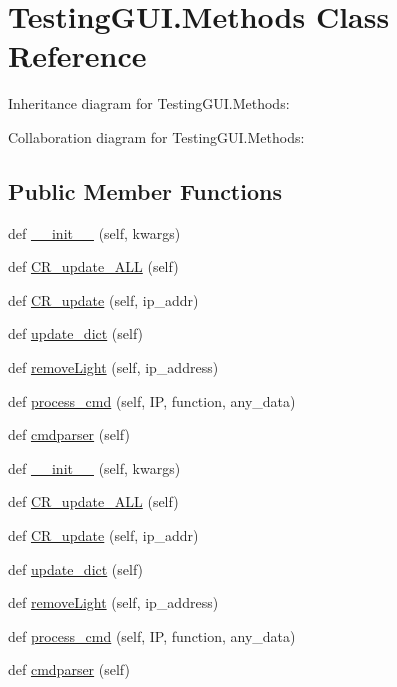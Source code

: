 \hypertarget{classTestingGUI_1_1Methods}{}\section{Testing\+G\+U\+I.\+Methods Class Reference}
\label{classTestingGUI_1_1Methods}


Inheritance diagram for Testing\+G\+U\+I.\+Methods\+:


Collaboration diagram for Testing\+G\+U\+I.\+Methods\+:
\subsection*{Public Member Functions}
\begin{DoxyCompactItemize}
\item 
def \hyperlink{classTestingGUI_1_1Methods_a6b7453ea737e1e8b53e33f999d0c9f2a}{\+\_\+\+\_\+init\+\_\+\+\_\+} (self, kwargs)
\item 
def \hyperlink{classTestingGUI_1_1Methods_a7caae1065692f63bf28b64e8f7c0709b}{C\+R\+\_\+update\+\_\+\+A\+LL} (self)
\item 
def \hyperlink{classTestingGUI_1_1Methods_a9c1aa20eca768d36ff23c118e35052eb}{C\+R\+\_\+update} (self, ip\+\_\+addr)
\item 
def \hyperlink{classTestingGUI_1_1Methods_a0709231f5f6f33c59ce325c7e3ebf156}{update\+\_\+dict} (self)
\item 
def \hyperlink{classTestingGUI_1_1Methods_adcf75d9e2ac64426a6f46e7797d221c0}{remove\+Light} (self, ip\+\_\+address)
\item 
def \hyperlink{classTestingGUI_1_1Methods_a5313fe533c054cf6077aeb101de8e73b}{process\+\_\+cmd} (self, IP, function, any\+\_\+data)
\item 
def \hyperlink{classTestingGUI_1_1Methods_aefc0f91f471aeef7ee76a5ad85ad8afc}{cmdparser} (self)
\item 
def \hyperlink{classTestingGUI_1_1Methods_a6b7453ea737e1e8b53e33f999d0c9f2a}{\+\_\+\+\_\+init\+\_\+\+\_\+} (self, kwargs)
\item 
def \hyperlink{classTestingGUI_1_1Methods_a7caae1065692f63bf28b64e8f7c0709b}{C\+R\+\_\+update\+\_\+\+A\+LL} (self)
\item 
def \hyperlink{classTestingGUI_1_1Methods_a9c1aa20eca768d36ff23c118e35052eb}{C\+R\+\_\+update} (self, ip\+\_\+addr)
\item 
def \hyperlink{classTestingGUI_1_1Methods_a0709231f5f6f33c59ce325c7e3ebf156}{update\+\_\+dict} (self)
\item 
def \hyperlink{classTestingGUI_1_1Methods_adcf75d9e2ac64426a6f46e7797d221c0}{remove\+Light} (self, ip\+\_\+address)
\item 
def \hyperlink{classTestingGUI_1_1Methods_a5313fe533c054cf6077aeb101de8e73b}{process\+\_\+cmd} (self, IP, function, any\+\_\+data)
\item 
def \hyperlink{classTestingGUI_1_1Methods_aefc0f91f471aeef7ee76a5ad85ad8afc}{cmdparser} (self)
\end{DoxyCompactItemize}


